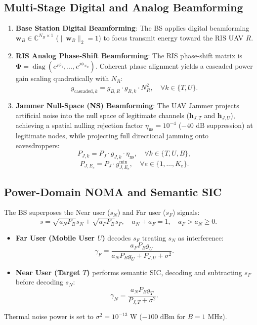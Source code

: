 \documentclass[journal,onecolumn]{IEEEtran}
\begin{document}
\subsection{Multi-Stage Digital and Analog Beamforming}
\begin{enumerate}
    \item \textbf{Base Station Digital Beamforming}: The BS applies digital beamforming $\mathbf{w}_B \in \mathbb{C}^{N_B \times 1}$ ($\|\mathbf{w}_B\|_2 = 1$) to focus transmit energy toward the RIS UAV $R$.
    \item \textbf{RIS Analog Phase-Shift Beamforming}: The RIS phase-shift matrix is $\bm{\Phi} = \operatorname{diag}(e^{j\phi_1}, \dots, e^{j\phi_{N_R}})$. Coherent phase alignment yields a cascaded power gain scaling quadratically with $N_R$:
    \begin{equation}
        g_{\text{cascaded}, k} = g_{B,R} \cdot g_{R,k} \cdot N_R^2, \quad \forall k \in \{T, U\}.
    \end{equation}
    \item \textbf{Jammer Null-Space (NS) Beamforming}: The UAV Jammer projects artificial noise into the null space of legitimate channels ($\mathbf{h}_{J,T}$ and $\mathbf{h}_{J,U}$), achieving a spatial nulling rejection factor $\eta_{\text{ns}} = 10^{-4}$ ($-40\text{ dB}$ suppression) at legitimate nodes, while projecting full directional jamming onto eavesdroppers:
    \begin{equation}
        P_{J, k} = P_J \cdot g_{J,k} \cdot \eta_{\text{ns}}, \quad \forall k \in \{T, U, B\},
    \end{equation}
    \begin{equation}
        P_{J, E_e} = P_J \cdot g_{J, E_e}^{\min}, \quad \forall e \in \{1, \dots, K_e\}.
    \end{equation}
\end{enumerate}

\subsection{Power-Domain NOMA and Semantic SIC}
The BS superposes the Near user ($s_N$) and Far user ($s_F$) signals:
\begin{equation}
    s = \sqrt{a_N P_B} s_N + \sqrt{a_F P_B} s_F, \quad a_N + a_F = 1, \quad a_F > a_N \ge 0.
\end{equation}
\begin{itemize}
    \item \textbf{Far User (Mobile User $U$)} decodes $s_F$ treating $s_N$ as interference:
    \begin{equation}
        \gamma_F = \frac{a_F P_B g_U}{a_N P_B g_U + P_{J, U} + \sigma^2}.
    \end{equation}
    \item \textbf{Near User (Target $T$)} performs semantic SIC, decoding and subtracting $s_F$ before decoding $s_N$:
    \begin{equation}
        \gamma_N = \frac{a_N P_B g_T}{P_{J, T} + \sigma^2}.
    \end{equation}
\end{itemize}
Thermal noise power is set to $\sigma^2 = 10^{-13}\text{ W}$ ($-100\text{ dBm}$ for $B = 1\text{ MHz}$).
\end{document}
